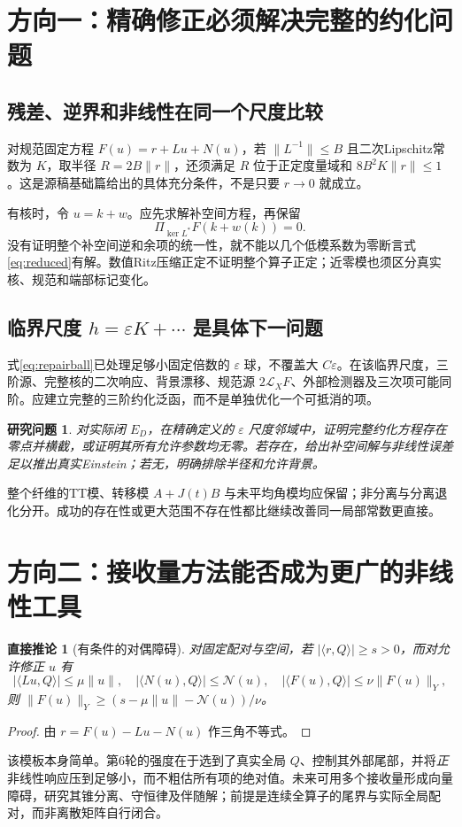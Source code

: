 \documentclass[UTF8,fontset=fandol,zihao=-4]{ctexart}
\theoremstyle{research}
\newtheorem{lemma}[sourceprop]{直接推论}
\newtheorem{target}[sourceprop]{研究问题}
\begin{document}
\section{方向一：精确修正必须解决完整的约化问题}
\subsection{残差、逆界和非线性在同一个尺度比较}
对规范固定方程 $F(u)=r+Lu+N(u)$，若 $\|L^{-1}\|\le B$ 且二次Lipschitz常数为 $K$，取半径 $R=2B\|r\|$，还须满足 $R$ 位于正定度量域和 $8B^2K\|r\|\le1$。这是源稿基础篇给出的具体充分条件，不是只要 $r\to0$ 就成立。

有核时，令 $u=k+w$。应先求解补空间方程，再保留
\begin{equation}\label{eq:reduced}
 \Pi_{\ker L^*}F(k+w(k))=0.
\end{equation}
没有证明整个补空间逆和余项的统一性，就不能以几个低模系数为零断言式\eqref{eq:reduced}有解。数值Ritz压缩正定不证明整个算子正定；近零模也须区分真实核、规范和端部标记变化。

\subsection{临界尺度 $h=\varepsilon K+\cdots$ 是具体下一问题}
式\eqref{eq:repairball}已处理足够小固定倍数的 $\varepsilon$ 球，不覆盖大 $C\varepsilon$。在该临界尺度，三阶源、完整核的二次响应、背景漂移、规范源 $2\mathcal L_XF$、外部检测器及三次项可能同阶。应建立完整的三阶约化泛函，而不是单独优化一个可抵消的项。

\begin{target}
对实际闭 $E_D$，在精确定义的 $\varepsilon$ 尺度邻域中，证明完整约化方程存在零点并横截，或证明其所有允许参数均无零。若存在，给出补空间解与非线性误差足以推出真实Einstein；若无，明确排除半径和允许背景。
\end{target}
整个纤维的TT模、转移模 $A+J(t)B$ 与未平均角模均应保留；非分离与分离退化分开。成功的存在性或更大范围不存在性都比继续改善同一局部常数更直接。

\section{方向二：接收量方法能否成为更广的非线性工具}
\begin{lemma}[有条件的对偶障碍]
对固定配对与空间，若 $|\langle r,Q\rangle|\ge s>0$，而对允许修正 $u$ 有
\[
 |\langle Lu,Q\rangle|\le\mu\|u\|,
 \quad |\langle N(u),Q\rangle|\le\mathcal N(u),
 \quad |\langle F(u),Q\rangle|\le\nu\|F(u)\|_Y,
\]
则 $\|F(u)\|_Y\ge(s-\mu\|u\|-\mathcal N(u))/\nu$。
\end{lemma}
\begin{proof}
由 $r=F(u)-Lu-N(u)$ 作三角不等式。
\end{proof}
该模板本身简单。第6轮的强度在于选到了真实全局 $Q$、控制其外部尾部，并将\emph{正}非线性响应压到足够小，而不粗估所有项的绝对值。未来可用多个接收量形成向量障碍，研究其锥分离、守恒律及伴随解；前提是连续全算子的尾界与实际全局配对，而非离散矩阵自行闭合。
\end{document}

